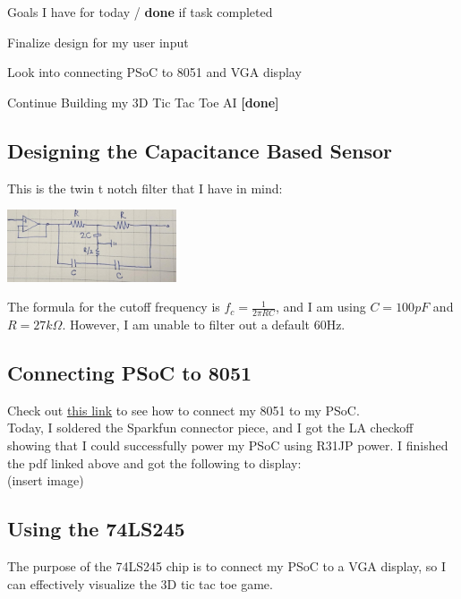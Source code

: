 \documentclass[12pt,twoside]{article}
\newenvironment{tight_itemize}{
\begin{itemize}
  \setlength{\itemsep}{0pt}
  \setlength{\parskip}{0pt}
}{\end{itemize}}
\begin{document}
Goals I have for today / {\bf done} if task completed
\begin{tight_itemize}
\item Finalize design for my user input %
\item Look into connecting PSoC to 8051 and VGA display
\item Continue Building my 3D Tic Tac Toe AI {\bf [done]}
\end{tight_itemize}

\subsection{Designing the Capacitance Based Sensor } 
This is the twin t notch filter that I have in mind: 
\begin{center} \includegraphics[width = 50mm]{Pics/4-25a.jpg}  \end{center}
The formula for the cutoff frequency is $f_c = \frac{1}{2\pi RC}$, and I am using $C = 100pF$ and $R = 27k\Omega$. However, I am unable to filter out a default 60Hz. 

\subsection{Connecting PSoC to 8051}
Check out \href{http://web.mit.edu/6.115/www/document/cable_blackbird.pdf}{this link} to see how to connect my 8051 to my PSoC. 
\\ Today, I soldered the Sparkfun connector piece, and I got the LA checkoff showing that I could successfully power my PSoC using R31JP power. I finished the pdf linked above and got the following to display:
\\ (insert image)

\subsection{Using the 74LS245}
The purpose of the 74LS245 chip is to connect my PSoC to a VGA display, so I can effectively visualize the 3D tic tac toe game. 
\end{document}
